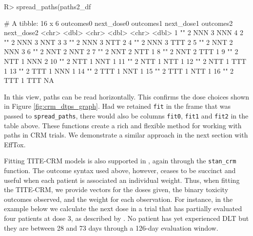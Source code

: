 \documentclass[article]{jss}
\begin{document}
\begin{CodeChunk}

\begin{CodeInput}
R> spread_paths(paths2_df %
\end{CodeInput}

\begin{CodeOutput}
# A tibble: 16 x 6
   outcomes0 next_dose0 outcomes1 next_dose1 outcomes2 next_dose2
   <chr>          <dbl> <chr>          <dbl> <chr>          <dbl>
 1 ""                 2 NNN                3 NNN                4
 2 ""                 2 NNN                3 NNT                3
 3 ""                 2 NNN                3 NTT                2
 4 ""                 2 NNN                3 TTT                2
 5 ""                 2 NNT                2 NNN                3
 6 ""                 2 NNT                2 NNT                2
 7 ""                 2 NNT                2 NTT                1
 8 ""                 2 NNT                2 TTT                1
 9 ""                 2 NTT                1 NNN                2
10 ""                 2 NTT                1 NNT                1
11 ""                 2 NTT                1 NTT                1
12 ""                 2 NTT                1 TTT                1
13 ""                 2 TTT                1 NNN                1
14 ""                 2 TTT                1 NNT                1
15 ""                 2 TTT                1 NTT                1
16 ""                 2 TTT                1 TTT               NA
\end{CodeOutput}
\end{CodeChunk}

In this view, paths can be read horizontally. This confirms the dose
choices shown in Figure \ref{fig:crm_dtps_graph}. Had we retained
\texttt{fit} in the frame that was passed to \texttt{spread\_paths},
there would also be columns \texttt{fit0}, \texttt{fit1} and
\texttt{fit2} in the table above. These functions create a rich and
flexible method for working with paths in CRM trials. We demonstrate a
similar approach in the next section with EffTox.

Fitting TITE-CRM models is also supported in , again through
the \texttt{stan\_crm} function. The outcome syntax used above, however,
ceases to be succinct and useful when each patient is associated an
individual weight. Thus, when fitting the TITE-CRM, we provide vectors
for the doses given, the binary toxicity outcomes observed, and the
weight for each observation. For instance, in the example below we
calculate the next dose in a trial that has partially evaluated four
patients at dose 3, as described by \citet[p.124]{Cheung2011}. No
patient has yet experienced DLT but they are between 28 and 73 days
through a 126-day evaluation window.
\end{document}
